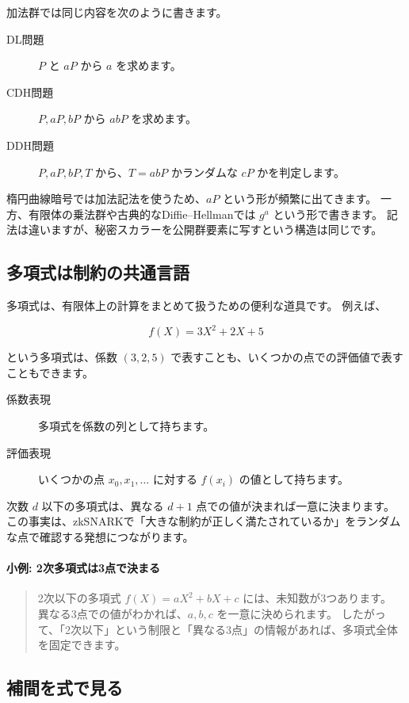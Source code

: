 \documentclass[a4paper,11pt]{ltjsarticle}
\newenvironment{examplebox}[1]{%
  \paragraph*{#1}\begin{quote}
}{%
  \end{quote}
}
\begin{document}
加法群では同じ内容を次のように書きます。

\begin{description}
  \item[DL問題] \(P\) と \(aP\) から \(a\) を求めます。
  \item[CDH問題] \(P,aP,bP\) から \(abP\) を求めます。
  \item[DDH問題] \(P,aP,bP,T\) から、\(T=abP\) かランダムな \(cP\) かを判定します。
\end{description}

楕円曲線暗号では加法記法を使うため、\(aP\) という形が頻繁に出てきます。
一方、有限体の乗法群や古典的なDiffie--Hellmanでは \(g^a\) という形で書きます。
記法は違いますが、秘密スカラーを公開群要素に写すという構造は同じです。

\subsection{多項式は制約の共通言語}

多項式は、有限体上の計算をまとめて扱うための便利な道具です。
例えば、

\[
  f(X) = 3X^2 + 2X + 5
\]

という多項式は、係数 \((3,2,5)\) で表すことも、いくつかの点での評価値で表すこともできます。

\begin{description}
  \item[係数表現] 多項式を係数の列として持ちます。
  \item[評価表現] いくつかの点 \(x_0,x_1,\ldots\) に対する \(f(x_i)\) の値として持ちます。
\end{description}

次数 \(d\) 以下の多項式は、異なる \(d+1\) 点での値が決まれば一意に決まります。
この事実は、zkSNARKで「大きな制約が正しく満たされているか」をランダムな点で確認する発想につながります。

\begin{examplebox}{小例: 2次多項式は3点で決まる}
2次以下の多項式 \(f(X)=aX^2+bX+c\) には、未知数が3つあります。
異なる3点での値がわかれば、\(a,b,c\) を一意に決められます。
したがって、「2次以下」という制限と「異なる3点」の情報があれば、多項式全体を固定できます。
\end{examplebox}

\subsection{補間を式で見る}
\end{document}
